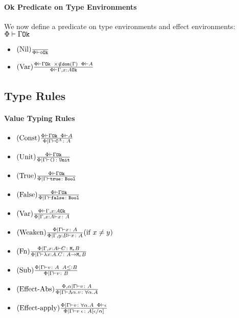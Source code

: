 {\paragraph{Ok Predicate on Type Environments}
We now define a predicate on type environments and effect environments: $\Phi\vdash \Gamma \texttt{Ok}$

\begin{itemize}
    \item $(\text{Nil}) \frac{}{\Phi\vdash \diamond \texttt{Ok}}$
    \item $(\text{Var}) \frac{\Phi\vdash \Gamma \texttt{Ok}\;\;\times\notin\texttt{dom}(\Gamma)\;\; \Phi\vdash A}{\Phi\vdash \Gamma, x: A \texttt{Ok}}$
\end{itemize}

\subsection{Type Rules}
\paragraph{Value Typing Rules}
\begin{itemize}
    \item $(\text{Const}) \frac{\Phi\vdash \Gamma \texttt{Ok}\;\;\Phi\vdash A}{\Phi\mid\Gamma \vdash \texttt{C}^{A} \colon A}$
    \item $(\text{Unit}) \frac{\Phi\vdash \Gamma \texttt{Ok}}{\Phi\mid\Gamma \vdash \texttt{()} \colon \texttt{Unit}}$
    \item $(\text{True}) \frac{\Phi\vdash \Gamma \texttt{Ok}}{\Phi\mid\Gamma \vdash \texttt{true} \colon \texttt{Bool}}$
    \item $(\text{False}) \frac{\Phi\vdash \Gamma \texttt{Ok}}{\Phi\mid\Gamma \vdash \texttt{false} \colon \texttt{Bool}}$
    \item $(\text{Var}) \frac{\Phi\vdash \Gamma, x: A \texttt{Ok}}{\Phi\mid\Gamma, x: A \vdash x \colon A}$
    \item $(\text{Weaken}) \frac{\Phi\mid\Gamma \vdash x \colon A}{\Phi\mid\Gamma, y: B \vdash x \colon A}(\text{if } x \neq y)$
    \item $(\text{Fn}) \frac{\Phi\mid\Gamma, x: A \vdash C \colon \texttt{M}_{\epsilon}{B}}{\Phi\mid\Gamma \vdash \lambda x : A. C \colon A \rightarrow \texttt{M}_{\epsilon}{B}}$
    \item $(\text{Sub}) \frac{\Phi\mid\Gamma \vdash v \colon A\;\; A \leq: B}{\Phi\mid\Gamma \vdash v \colon B}$
    \item $(\text{Effect-Abs}) \frac{\Phi,\alpha\mid\Gamma \vdash v \colon A}{\Phi\mid\Gamma \vdash \Lambda \alpha. v \colon \forall \alpha. A}$
    \item $(\text{Effect-apply}) \frac{\Phi\mid\Gamma \vdash v \colon \forall \alpha. A\;\;\Phi\vdash \epsilon}{\Phi\mid\Gamma \vdash v\;\epsilon \colon A\left[\epsilon / \alpha\right]}$
\end{itemize}
}
